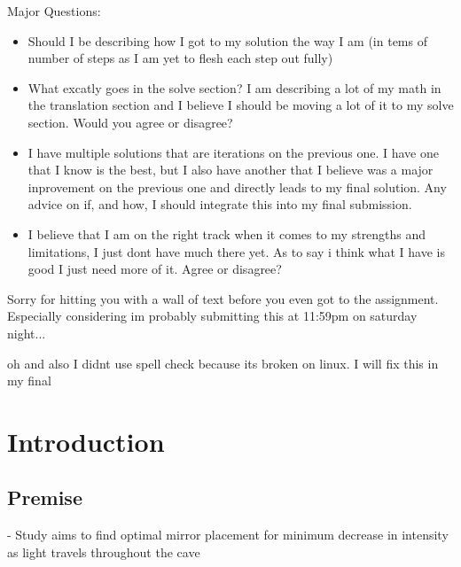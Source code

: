 \documentclass[11pt, letterpaper]{article}
\begin{document}
Major Questions:
\begin{itemize}
	\item Should I be describing how I got to my solution the way I am (in tems of number of steps as I am yet to flesh each step out fully)  
	
	\item What excatly goes in the solve section? I am describing a lot of my math in the translation section and I believe I should be moving a lot of it to my solve section. Would you agree or disagree?
	
	\item I have multiple solutions that are iterations on the previous one. I have one that I know is the best, but I also have another that I believe was a major inprovement on the previous one and directly leads to my final solution. Any advice on if, and how, I should integrate this into my final submission. 
	
	\item I believe that I am on the right track when it comes to my strengths and limitations, I just dont have much there yet. As to say i think what I have is good I just need more of it. Agree or disagree?

\end{itemize}

\par 
Sorry for hitting you with a wall of text before you even got to the assignment. Especially considering im probably submitting this at 11:59pm on saturday night... 

oh and also I didnt use spell check because its broken on linux. I will fix this in my final

\section{Introduction}


\subsection{Premise}
- Study aims to find optimal mirror placement for minimum decrease in intensity as light travels throughout the cave 
\end{document}
